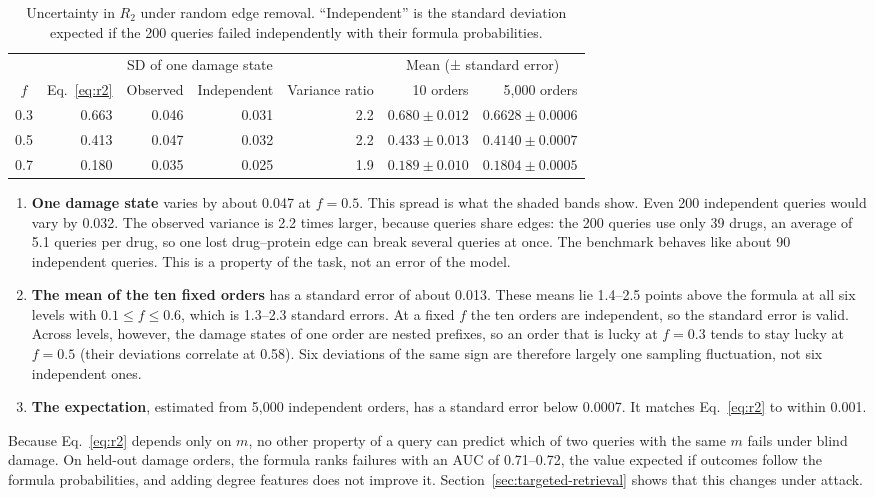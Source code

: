 \begin{table}[!htbp]
\centering
\small
\caption{Uncertainty in $R_2$ under random edge removal. ``Independent'' is the
standard deviation expected if the 200 queries failed independently with their
formula probabilities.}
\label{tab:uncertainty}
\begin{tabular}{@{}crrrrrr@{}}
\toprule
& & \multicolumn{2}{c}{SD of one damage state} & & \multicolumn{2}{c}{Mean (± standard error)} \\
\cmidrule(lr){3-4}\cmidrule(lr){6-7}
$f$ & Eq.~\eqref{eq:r2} & Observed & Independent & Variance ratio & 10 orders & 5,000 orders \\
\midrule
0.3 & 0.663 & 0.046 & 0.031 & 2.2 & $0.680 \pm 0.012$ & $0.6628 \pm 0.0006$ \\
0.5 & 0.413 & 0.047 & 0.032 & 2.2 & $0.433 \pm 0.013$ & $0.4140 \pm 0.0007$ \\
0.7 & 0.180 & 0.035 & 0.025 & 1.9 & $0.189 \pm 0.010$ & $0.1804 \pm 0.0005$ \\
\bottomrule
\end{tabular}
\end{table}

\begin{enumerate}[leftmargin=*,itemsep=2pt]
\item \textbf{One damage state} varies by about 0.047 at $f=0.5$. This spread is
what the shaded bands show. Even 200 independent queries would vary by 0.032.
The observed variance is 2.2 times larger, because queries share edges: the
200 queries use only 39 drugs, an average of 5.1 queries per drug, so one lost
drug--protein edge can break several queries at once. The benchmark behaves
like about 90 independent queries. This is a property of the task, not an
error of the model.
\item \textbf{The mean of the ten fixed orders} has a standard error of about
0.013. These means lie 1.4--2.5 points above the formula at all six levels with
$0.1\le f\le0.6$, which is 1.3--2.3 standard errors. At a fixed $f$ the ten
orders are independent, so the standard error is valid. Across levels, however,
the damage states of one order are nested prefixes, so an order that is lucky
at $f=0.3$ tends to stay lucky at $f=0.5$ (their deviations correlate at 0.58).
Six deviations of the same sign are therefore largely one sampling
fluctuation, not six independent ones.
\item \textbf{The expectation}, estimated from 5,000 independent orders, has a
standard error below 0.0007. It matches Eq.~\eqref{eq:r2} to within 0.001.
\end{enumerate}

Because Eq.~\eqref{eq:r2} depends only on $m$, no other property of a query can
predict which of two queries with the same $m$ fails under blind damage. On
held-out damage orders, the formula ranks failures with an AUC of 0.71--0.72,
the value expected if outcomes follow the formula probabilities, and adding
degree features does not improve it. Section~\ref{sec:targeted-retrieval} shows
that this changes under attack.
